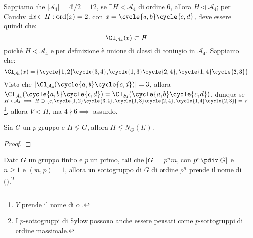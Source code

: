 \documentclass[11pt]{scrartcl}
\begin{document}
\begin{example}
    Sappiamo che $|\mathcal{A}_4| = 4!/2 = 12$, se $\exists H < \mathcal{A}_4$ di ordine $6$, allora $H \triangleleft \mathcal{A}_4$; per \hyperref[p:Cauchy]{Cauchy}
    $\exists x \in H : \operatorname{ord}(x) = 2$, con $x = \cycle{a,b}\cycle{c,d}$, deve essere quindi che:
        \[ \Cl_{\mathcal{A}_4}(x) \subset H
            \]
    poiché $H \triangleleft \mathcal{A}_4$ e per definizione è unione di classi di coniugio in $\mathcal{A}_4$. Sappiamo che:
        \[ \Cl_{\mathcal{A}_4}(x) = \{ \cycle{1,2}\cycle{3,4}, \cycle{1,3}\cycle{2,4}, \cycle{1,4}\cycle{2,3}\}
            \]
    Visto che $|\Cl_{\mathcal{A}_4}(\cycle{a,b} \cycle{c,d})| = 3$, allora $\Cl_{\mathcal{A}_4}(\cycle{a,b} \cycle{c,d}) = \Cl_{S_4}(\cycle{a,b} \cycle{c,d})$,
    dunque se $H \triangleleft \mathcal{A}_4 \implies H \supset \{e, \cycle{1,2}\cycle{3,4}, \cycle{1,3}\cycle{2,4}, \cycle{1,4}\cycle{2,3}\} = V$ \footnote{$V$ prende il nome di  o .},
    allora $V < H$, ma $4 \nmid 6 \implies$ assurdo.
\end{example}

\begin{lemma}
    \label{l:1.95}
    Sia $G$ un $p$-gruppo e $H \lneq G$, allora $H \lneq N_G(H)$.
\end{lemma}

\begin{proof}
    
\end{proof}

\begin{definition}
    Dato $G$ un gruppo finito e $p$ un primo, tali che $|G| = p^nm$, con $p^n \pdiv |G|$ e $n \geq 1$ e $(m,p) = 1$, allora un sottogruppo di $G$ di ordine $p^n$ prende il nome di 
     ().\footnote{I $p$-sottogruppi di Sylow possono anche essere pensati come $p$-sottogruppi di ordine massimale.}
\end{definition}

\newpage
\end{document}
